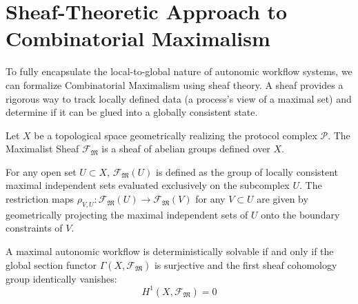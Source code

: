 \section{Sheaf-Theoretic Approach to Combinatorial Maximalism}

To fully encapsulate the local-to-global nature of autonomic workflow systems, we can formalize Combinatorial Maximalism using sheaf theory. A sheaf provides a rigorous way to track locally defined data (a process's view of a maximal set) and determine if it can be glued into a globally consistent state.

\begin{definition}
Let $X$ be a topological space geometrically realizing the protocol complex $\mathcal{P}$. The Maximalist Sheaf $\mathscr{F}_{\mathfrak{M}}$ is a sheaf of abelian groups defined over $X$. 

For any open set $U \subset X$, $\mathscr{F}_{\mathfrak{M}}(U)$ is defined as the group of locally consistent maximal independent sets evaluated exclusively on the subcomplex $U$. The restriction maps $\rho_{V,U}: \mathscr{F}_{\mathfrak{M}}(U) \to \mathscr{F}_{\mathfrak{M}}(V)$ for any $V \subset U$ are given by geometrically projecting the maximal independent sets of $U$ onto the boundary constraints of $V$.
\end{definition}

\begin{theorem}
A maximal autonomic workflow is deterministically solvable if and only if the global section functor $\Gamma(X, \mathscr{F}_{\mathfrak{M}})$ is surjective and the first sheaf cohomology group identically vanishes:
\[
H^1(X, \mathscr{F}_{\mathfrak{M}}) = 0
\]
\end{theorem}

